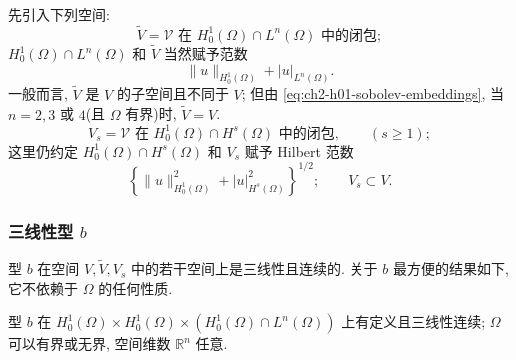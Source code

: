 先引入下列空间:
\begin{equation}
\widetilde V=\mathcal V\text{ 在 }H_0^1(\Omega)\cap L^n(\Omega)\text{ 中的闭包};
\label{eq:ch2-v-tilde-definition}
\end{equation}
$H_0^1(\Omega)\cap L^n(\Omega)$ 和 $\widetilde V$ 当然赋予范数
\begin{equation}
\lVert u\rVert_{H_0^1(\Omega)}+\lvert u\rvert_{L^n(\Omega)}.
\label{eq:ch2-v-tilde-norm}
\end{equation}
一般而言, $\widetilde V$ 是 $V$ 的子空间且不同于 $V$; 但由 \eqref{eq:ch2-h01-sobolev-embeddings}, 当 $n=2,3$ 或 $4$(且 $\Omega$ 有界)时, $\widetilde V=V$.
\begin{equation}
V_s=\mathcal V\text{ 在 }H_0^1(\Omega)\cap H^s(\Omega)\text{ 中的闭包},
\qquad(s\geq1);
\label{eq:ch2-vs-definition}
\end{equation}
这里仍约定 $H_0^1(\Omega)\cap H^s(\Omega)$ 和 $V_s$ 赋予 Hilbert 范数
\begin{equation}
\left\{\lVert u\rVert_{H_0^1(\Omega)}^2
+\lvert u\rvert_{H^s(\Omega)}^2\right\}^{1/2};
\qquad V_s\subset V.
\label{eq:ch2-vs-norm}
\end{equation}

\subsubsection*{三线性型 \texorpdfstring{$b$}{b}}

型 $b$ 在空间 $V,\widetilde V,V_s$ 中的若干空间上是三线性且连续的. 关于 $b$ 最方便的结果如下, 它不依赖于 $\Omega$ 的任何性质.

\begin{Lemma}
\label{lem:ch2-trilinear-continuity}
型 $b$ 在 $H_0^1(\Omega)\times H_0^1(\Omega)
\times(H_0^1(\Omega)\cap L^n(\Omega))$ 上有定义且三线性连续; $\Omega$ 可以有界或无界, 空间维数 $\mathbb R^n$ 任意.
\end{Lemma}

